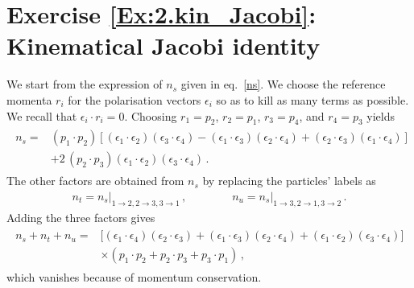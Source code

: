 \section*{Exercise \ref{Ex:2.kin_Jacobi}: Kinematical Jacobi identity}
\label{Sol:2.kin_Jacobi}
We start from the expression of $n_s$ given in eq.~\eqref{ns}.
We choose the reference momenta $r_i$ for the polarisation vectors $\epsilon_i$ so as to kill as many terms as possible. We recall that $\epsilon_i \cdot r_i = 0$. Choosing $r_1 = p_2$, $r_2 = p_1$, $r_3 = p_4$, and $r_4 = p_3$ yields
\begin{align}
\begin{aligned}
n_{s}= \phantom{ } & (p_1 \cdot p_2) \left[ (\epsilon_1\cdot \epsilon_2) (\epsilon_3\cdot \epsilon_4)   
  - (\epsilon_1\cdot \epsilon_3) (\epsilon_2\cdot \epsilon_4) 
  + (\epsilon_2\cdot \epsilon_3) (\epsilon_1\cdot \epsilon_4) \right] \\
  & + 2 \, (p_2 \cdot p_3)  (\epsilon_1\cdot \epsilon_2) (\epsilon_3\cdot \epsilon_4) \,.
\end{aligned}
\end{align}
The other factors are obtained from $n_s$ by replacing the particles' labels as
\begin{align}
n_t = n_s \bigl|_{1 \to 2, 2 \to 3, 3 \to 1} \,, \qquad \qquad n_u = n_s \bigl|_{1 \to 3, 2 \to 1, 3 \to 2} \,.
\end{align}
Adding the three factors gives
\begin{align}
\begin{aligned}
n_s + n_t + n_u = \phantom{ } & \bigl[ (\epsilon_1 \cdot \epsilon_4) (\epsilon_2 \cdot \epsilon_3) + 
  (\epsilon_1 \cdot \epsilon_3) (\epsilon_2 \cdot \epsilon_4) + (\epsilon_1 \cdot \epsilon_2) (\epsilon_3 \cdot \epsilon_4) \bigr]  \\
 & \times   ( p_1 \cdot p_2 +  p_2 \cdot p_3 + p_3 \cdot p_1 ) \,,
\end{aligned}
\end{align}
which vanishes because of momentum conservation.


